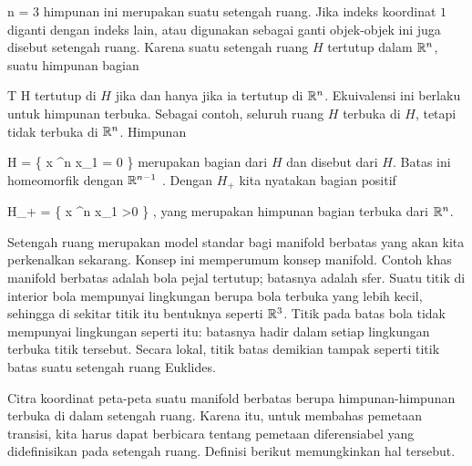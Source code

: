 \mavergleichskette
{\vergleichskette
{ n
}
{ = }{ 3
}
{  }{
}
{    }{
}
{   }{
}
}
{}{}{}
himpunan ini merupakan suatu setengah ruang. Jika indeks koordinat $1$ diganti dengan indeks lain, atau \anfuehrung{$\leq$}{} digunakan sebagai ganti \anfuehrung{$\geq$ }{,} objek-objek ini juga disebut setengah ruang. Karena suatu setengah ruang $H$ tertutup dalam ${\mathbb R}^n$, suatu himpunan bagian

\mavergleichskette
{\vergleichskette
{ T
}
{ \subseteq }{ H
}
{  }{
}
{    }{
}
{   }{
}
}
{}{}{}
tertutup di $H$ jika dan hanya jika ia tertutup di ${\mathbb R}^n$. Ekuivalensi ini
 berlaku untuk himpunan terbuka. Sebagai contoh, seluruh ruang $H$ terbuka di $H$, tetapi tidak terbuka di ${\mathbb R}^n$. Himpunan

\mavergleichskettedisp
{\vergleichskette
{ \partial H
}
{ =} { \left\{  x \in \R^n   \mid   x_1 = 0        \right\}
}
{ } {
}
{ } {
}
{ } {
}
}
{}{}{}
merupakan bagian dari $H$ dan disebut  {} dari $H$. Batas ini homeomorfik dengan ${\mathbb R}^{n-1}$
 {} {.}
Dengan $H_+$ kita nyatakan bagian positif

\mavergleichskette
{\vergleichskette
{ H_+
}
{ = }{ \left\{  x \in \R^n   \mid   x_1 >0        \right\}
}
{  }{
}
{    }{
}
{   }{
}
}
{}{}{,}
yang merupakan himpunan bagian terbuka dari ${\mathbb R}^n$.

Setengah ruang merupakan model standar bagi manifold berbatas yang akan kita perkenalkan sekarang. Konsep ini memperumum konsep manifold. Contoh khas manifold berbatas adalah bola pejal tertutup; batasnya adalah sfer. Suatu titik di interior bola mempunyai lingkungan berupa bola terbuka yang lebih kecil, sehingga di sekitar titik itu bentuknya  seperti ${\mathbb R}^3$. Titik pada batas bola tidak mempunyai lingkungan seperti itu: batasnya hadir dalam setiap lingkungan terbuka titik tersebut. Secara lokal, titik batas demikian tampak seperti titik batas suatu setengah ruang Euklides.

Citra koordinat peta-peta suatu manifold berbatas berupa himpunan-himpunan terbuka di dalam setengah ruang. Karena itu, untuk membahas pemetaan transisi, kita harus dapat berbicara tentang pemetaan diferensiabel yang didefinisikan pada setengah ruang. Definisi berikut memungkinkan hal tersebut.

